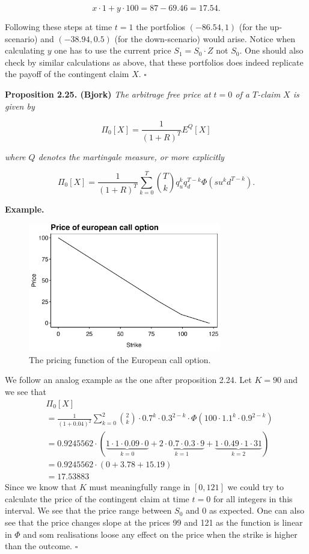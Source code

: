\documentclass[a4paper,12pt,openany]{book}
\begin{document}
\[
x\cdot 1+y\cdot100=87-69.46=17.54.
\]

Following these steps at time \(t=1\) the portfolios \((-86.54,1)\) (for the up-scenario) and \((-38.94,0.5)\) (for the down-scenario) would arise. Notice when calculating \(y\) one has to use the current price \(S_1=S_0\cdot Z\) not \(S_0\). One should also check by similar calculations as above, that these portfolios does indeed replicate the payoff of the contingent claim \(X\). \(\square\)

\textbf{Proposition 2.25. (Bjork)} \emph{The arbitrage free price at \(t=0\) of a \(T\)-claim \(X\) is given by}

\[
\Pi_0[X]=\frac{1}{(1+R)^T}E^Q[X]
\]

\emph{where \(Q\) denotes the martingale measure, or more explicitly}

\[
\Pi_0[X]=\frac{1}{(1+R)^T}\sum_{k=0}^T\binom{T}{k}q_u^kq_d^{T-k}\Phi(su^kd^{T-k}).
\]

\textbf{Example.}

\begin{figure}[H]
  \begin{center}
    \includegraphics[width=0.75\textwidth]{figures/BS_call_price.png}
  \end{center}
  \caption{The pricing function of the European call option.}
\end{figure}

We follow an analog example as the one after proposition 2.24. Let \(K=90\) and we see that
\begin{align*}
&\Pi_0[X]\\
&=\frac{1}{(1+0.04)^2}\sum_{k=0}^2\binom{2}{k}\cdot0.7^k\cdot0.3^{2-k}\cdot\Phi(100\cdot 1.1^k\cdot0.9^{2-k})\\
&=0.9245562\cdot\left(\underbrace{1\cdot 1\cdot0.09\cdot0}_{k=0}+\underbrace{2\cdot 0.7\cdot0.
3\cdot 9}_{k=1}+\underbrace{1\cdot 0.49\cdot1\cdot31}_{k=2}\right)\\
&=0.9245562\cdot\left(0+3.78+15.19\right)\\
&=17.53883
\end{align*}
Since we know that \(K\) must meaningfully range in \([0,121]\) we could try to calculate the price of the contingent claim at time \(t=0\) for all integers in this interval. We see that the price range between \(S_0\) and 0 as expected. One can also see that the price changes slope at the prices 99 and 121 as the function is linear in \(\Phi\) and som realisations loose any effect on the price when the strike is higher than the outcome. \(\square\)
\end{document}
